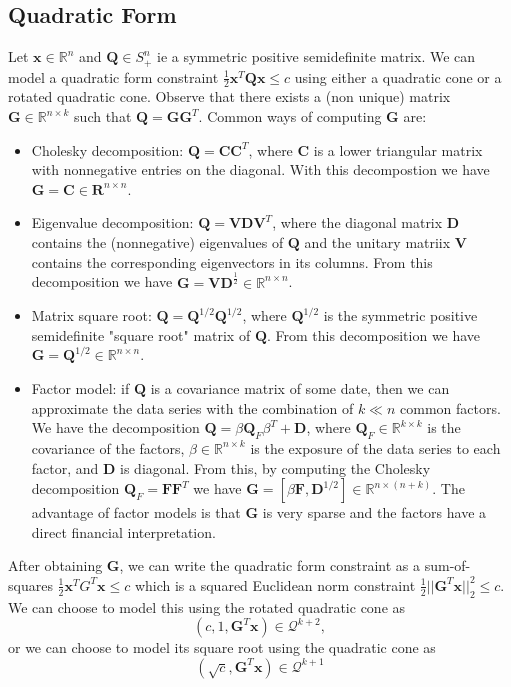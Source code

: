 \documentclass{article}
\begin{document}
\subsection{Quadratic Form}
Let $\mathbf{x} \in \mathbb{R}^n$ and $\mathbf{Q}\in S^n_+$ ie a symmetric
positive semidefinite matrix. We can model a quadratic form constraint
$\frac{1}{2}\mathbf{x}^T\mathbf{Q}\mathbf{x}\leq c$ using either a
quadratic cone or a rotated quadratic cone. Observe that there exists
a (non unique) matrix $\mathbf{G}\in\mathbb{R}^{n \times k}$ such that
$\mathbf{Q} = \mathbf{G}\mathbf{G}^T$. Common ways of computing $\mathbf{G}$
are:
\begin{itemize}
\item{Cholesky decomposition:} $\mathbf{Q}=\mathbf{C}\mathbf{C}^T$, where
  $\mathbf{C}$ is a lower triangular matrix with nonnegative entries on
  the diagonal. With this decompostion we have
  $\mathbf{G}=\mathbf{C}\in\mathbf{R}^{n\times n}$.
\item{Eigenvalue decomposition:} $\mathbf{Q}=\mathbf{V}\mathbf{D}\mathbf{V}^T$,
  where the diagonal matrix $\mathbf{D}$ contains the (nonnegative)
  eigenvalues of $\mathbf{Q}$ and the unitary matriix $\mathbf{V}$ contains
  the corresponding eigenvectors in its columns. From this decomposition we
  have $\mathbf{G}=\mathbf{V}\mathbf{D}^{\frac{1}{2}}\in\mathbb{R}^{n\times n}$.
\item{Matrix square root:} $\mathbf{Q}=\mathbf{Q}^{1/2}\mathbf{Q}^{1/2}$, where
  $\mathbf{Q}^{1/2}$ is the symmetric positive semidefinite "square root"
  matrix of $\mathbf{Q}$. From this decomposition we have
  $\mathbf{G}=\mathbf{Q}^{1/2} \in \mathbb{R}^{n\times n}$.
\item{Factor model:} if $\mathbf{Q}$ is a covariance matrix of some date, then we can
  approximate the data series with the combination of $k \ll n$ common factors. We
  have the decomposition $\mathbf{Q}=\beta\mathbf{Q}_F\beta^T + \mathbf{D}$,
  where $\mathbf{Q}_F\in \mathbb{R}^{k\times k}$ is the covariance of the
  factors, $\beta\in\mathbb{R}^{n\times k}$ is the exposure of the data series
  to each factor, and $\mathbf{D}$ is diagonal. From this, by computing the
  Cholesky decomposition $\mathbf{Q}_F=\mathbf{F}\mathbf{F}^T$ we have
  $\mathbf{G}=[\beta\mathbf{F},\mathbf{D}^{1/2}]\in\mathbb{R}^{n\times(n+k)}$.
  The advantage of factor models is that $\mathbf{G}$ is very sparse and the
  factors have a direct financial interpretation.
\end{itemize}

After obtaining $\mathbf{G}$, we can write the quadratic form constraint as a
sum-of-squares $\frac{1}{2}\mathbf{x}^T\mathbf{}G^T\mathbf{x}\leq c$ which
is a squared Euclidean norm constraint
$\frac{1}{2}||\mathbf{G}^T\mathbf{x}||_2^2 \leq c$.
We can choose to model this using the rotated quadratic cone as
$$(c,1,\mathbf{G}^T\mathbf{x})\in \mathcal{Q}^{k+2},$$
or we can choose to model its square root using the quadratic cone as
$$(\sqrt{c}, \mathbf{G}^T\mathbf{x})\in\mathcal{Q}^{k+1}$$
\end{document}
